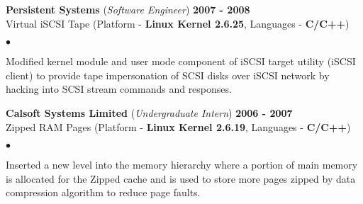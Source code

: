 \documentclass[margin,line]{res}
\newenvironment{list2}{
  \begin{list}{$\bullet$}{%
      \setlength{\itemsep}{0.05in}
      \setlength{\parsep}{0in} \setlength{\parskip}{0in}
      \setlength{\topsep}{-0.1in} \setlength{\partopsep}{0in}
      \setlength{\leftmargin}{0.2in}}}{\end{list}}
\begin{document}
\begin{resume}
{\bf Persistent Systems} ({\em Software Engineer}) \hfill {\bf 2007 - 2008}\\
Virtual iSCSI Tape (Platform - {\bf Linux Kernel 2.6.25}, Languages - {\bf C/C++})
\begin{list2}
\item Modified kernel module and user mode component of iSCSI target utility (iSCSI client) to provide
tape impersonation of SCSI disks over iSCSI network by hacking into SCSI stream commands and responses.
\end{list2}

{\bf Calsoft Systems Limited} ({\em Undergraduate Intern}) \hfill {\bf 2006 - 2007}\\
Zipped RAM Pages (Platform - {\bf Linux Kernel 2.6.19}, Languages - {\bf C/C++})
\begin{list2}
\item Inserted a new level into the memory hierarchy where a portion of main memory is allocated for the Zipped cache
and is used to store more pages zipped by data compression algorithm to reduce page faults.
\end{list2}

%
%


\end{resume}
\end{document}
